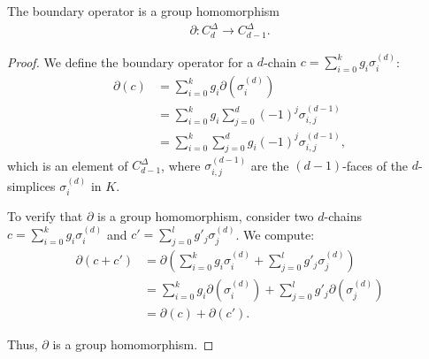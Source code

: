 \begin{lemma}
	The boundary operator is a group homomorphism
	\begin{align}
		\partial: C^{\Delta}_{d} \to C^{\Delta}_{d-1}.
	\end{align}
\end{lemma}

\begin{proof}
We define the boundary operator for a \( d \)-chain \( c = \sum_{i=0}^{k} g_{i} \sigma_{i}^{(d)} \):
\begin{align}
\partial(c) &= \sum_{i=0}^{k} g_{i} \partial(\sigma_{i}^{(d)}) \\
&= \sum_{i=0}^{k} g_{i} \sum_{j=0}^{d} (-1)^{j} \sigma_{i,j}^{(d-1)} \\
&= \sum_{i=0}^{k} \sum_{j=0}^{d} g_{i} (-1)^{j} \sigma_{i,j}^{(d-1)},
\end{align}
which is an element of \( C^{\Delta}_{d-1} \), where \( \sigma_{i,j}^{(d-1)} \) are the \( (d-1) \)-faces of the \( d \)-simplices \( \sigma_{i}^{(d)} \) in \( K \).

To verify that \( \partial \) is a group homomorphism, consider two \( d \)-chains \( c = \sum_{i=0}^{k} g_{i} \sigma_{i}^{(d)} \) and \( c' = \sum_{j=0}^{l} g'_{j} \sigma_{j}^{(d)} \). We compute:
\begin{align}
\partial(c + c') &= \partial\left( \sum_{i=0}^{k} g_{i} \sigma_{i}^{(d)} + \sum_{j=0}^{l} g'_{j} \sigma_{j}^{(d)} \right) \\
&= \sum_{i=0}^{k} g_{i} \partial(\sigma_{i}^{(d)}) + \sum_{j=0}^{l} g'_{j} \partial(\sigma_{j}^{(d)}) \\
&= \partial(c) + \partial(c').
\end{align}

Thus, \( \partial \) is a group homomorphism.
\end{proof}

